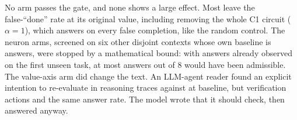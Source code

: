 No arm passes the gate, and none shows a large effect. Most leave the false-``done'' rate at its original value, including removing the whole C1 circuit ($\alpha=1$), which answers on every false completion, like the random control. The neuron arms, screened on six other disjoint contexts whose own baseline is \cNeuronBase{} \fsp{} answers, were stopped by a mathematical bound: with \cNeuronObs{} answers already observed on the first unseen \fsp{} task, at most \cNeuronMax{} answers out of 8 would have been admissible. The value-axis arm did change the text. An LLM-agent reader found an explicit intention to re-evaluate in \doubtPushFsPos{} \fsp{} reasoning traces against \doubtBaseFsPos{} at baseline, but \doubtPushStrict{} verification actions and the same answer rate. %
The model wrote that it should check, then answered anyway.

